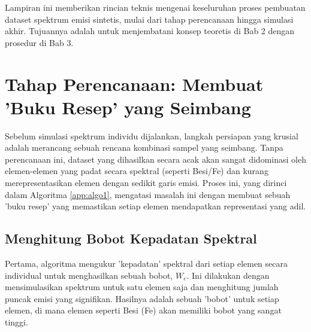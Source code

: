 
\begin{onehalfspace} %


\label{app:simulasi_dan_perencanaan}

Lampiran ini memberikan rincian teknis mengenai keseluruhan proses pembuatan dataset spektrum emisi sintetis, mulai dari tahap perencanaan hingga simulasi akhir. Tujuannya adalah untuk menjembatani konsep teoretis di Bab 2 dengan prosedur di Bab 3.

\section*{Tahap Perencanaan: Membuat 'Buku Resep' yang Seimbang}
Sebelum simulasi spektrum individu dijalankan, langkah persiapan yang krusial adalah merancang sebuah rencana kombinasi sampel yang seimbang. Tanpa perencanaan ini, dataset yang dihasilkan secara acak akan sangat didominasi oleh elemen-elemen yang padat secara spektral (seperti Besi/Fe) dan kurang merepresentasikan elemen dengan sedikit garis emisi. Proses ini, yang dirinci dalam Algoritma \ref{app:algo1}, mengatasi masalah ini dengan membuat sebuah 'buku resep' yang memastikan setiap elemen mendapatkan representasi yang adil.

\subsection*{Menghitung Bobot Kepadatan Spektral}
Pertama, algoritma mengukur 'kepadatan' spektral dari setiap elemen secara individual untuk menghasilkan sebuah bobot, $W_e$. Ini dilakukan dengan mensimulasikan spektrum untuk satu elemen saja dan menghitung jumlah puncak emisi yang signifikan. Hasilnya adalah sebuah 'bobot' untuk setiap elemen, di mana elemen seperti Besi (Fe) akan memiliki bobot yang sangat tinggi.


\end{onehalfspace}
